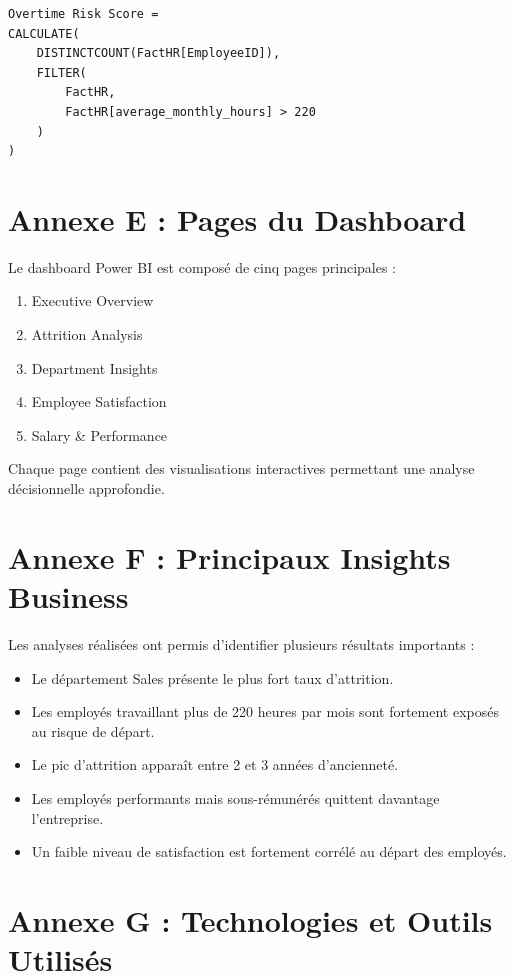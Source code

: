 \begin{verbatim}
Overtime Risk Score =
CALCULATE(
    DISTINCTCOUNT(FactHR[EmployeeID]),
    FILTER(
        FactHR,
        FactHR[average_monthly_hours] > 220
    )
)
\end{verbatim}

\section*{Annexe E : Pages du Dashboard}

Le dashboard Power BI est composé de cinq pages principales :

\begin{enumerate}
    \item Executive Overview
    \item Attrition Analysis
    \item Department Insights
    \item Employee Satisfaction
    \item Salary \& Performance
\end{enumerate}

Chaque page contient des visualisations interactives permettant une analyse décisionnelle approfondie.

\section*{Annexe F : Principaux Insights Business}

Les analyses réalisées ont permis d'identifier plusieurs résultats importants :

\begin{itemize}
    \item Le département Sales présente le plus fort taux d'attrition.
    \item Les employés travaillant plus de 220 heures par mois sont fortement exposés au risque de départ.
    \item Le pic d'attrition apparaît entre 2 et 3 années d'ancienneté.
    \item Les employés performants mais sous-rémunérés quittent davantage l'entreprise.
    \item Un faible niveau de satisfaction est fortement corrélé au départ des employés.
\end{itemize}

\section*{Annexe G : Technologies et Outils Utilisés}

